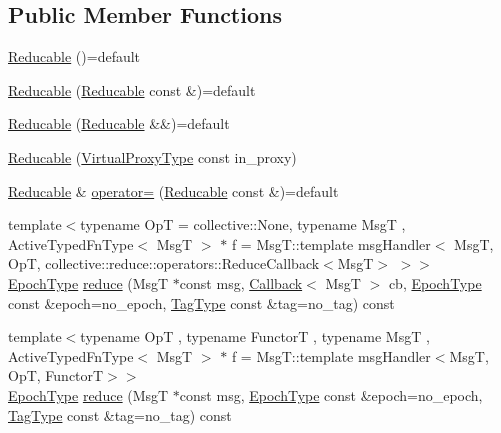 \subsection*{Public Member Functions}
\begin{DoxyCompactItemize}
\item 
\hyperlink{structvt_1_1vrt_1_1collection_1_1_reducable_a807b462380873448bfcf4661b4b28a2d}{Reducable} ()=default
\item 
\hyperlink{structvt_1_1vrt_1_1collection_1_1_reducable_aafc682961c7c961547d91358cda46792}{Reducable} (\hyperlink{structvt_1_1vrt_1_1collection_1_1_reducable}{Reducable} const \&)=default
\item 
\hyperlink{structvt_1_1vrt_1_1collection_1_1_reducable_a4c5250ba5364ae0965c119773e87f4e8}{Reducable} (\hyperlink{structvt_1_1vrt_1_1collection_1_1_reducable}{Reducable} \&\&)=default
\item 
\hyperlink{structvt_1_1vrt_1_1collection_1_1_reducable_a658b587cdafda69c95ad0a2efe7a73fe}{Reducable} (\hyperlink{namespacevt_a1b417dd5d684f045bb58a0ede70045ac}{Virtual\+Proxy\+Type} const in\+\_\+proxy)
\item 
\hyperlink{structvt_1_1vrt_1_1collection_1_1_reducable}{Reducable} \& \hyperlink{structvt_1_1vrt_1_1collection_1_1_reducable_a7df8661d0e353935f034c4c0174c0872}{operator=} (\hyperlink{structvt_1_1vrt_1_1collection_1_1_reducable}{Reducable} const \&)=default
\item 
{\footnotesize template$<$typename OpT  = collective\+::\+None, typename MsgT , Active\+Typed\+Fn\+Type$<$ Msg\+T $>$ $\ast$ f = Msg\+T\+::template msg\+Handler$<$      Msg\+T, Op\+T, collective\+::reduce\+::operators\+::\+Reduce\+Callback$<$\+Msg\+T$>$    $>$$>$ }\\\hyperlink{namespacevt_a985a5adf291c34a3ca263b3378388236}{Epoch\+Type} \hyperlink{structvt_1_1vrt_1_1collection_1_1_reducable_af049a8809d46da10f48d5fecbb1ace3d}{reduce} (MsgT $\ast$const msg, \hyperlink{namespacevt_a36db99df4c973d48b1118a293fff533f}{Callback}$<$ MsgT $>$ cb, \hyperlink{namespacevt_a985a5adf291c34a3ca263b3378388236}{Epoch\+Type} const \&epoch=no\+\_\+epoch, \hyperlink{namespacevt_a84ab281dae04a52a4b243d6bf62d0e52}{Tag\+Type} const \&tag=no\+\_\+tag) const
\item 
{\footnotesize template$<$typename OpT , typename FunctorT , typename MsgT , Active\+Typed\+Fn\+Type$<$ Msg\+T $>$ $\ast$ f = Msg\+T\+::template msg\+Handler$<$\+Msg\+T, Op\+T, Functor\+T$>$$>$ }\\\hyperlink{namespacevt_a985a5adf291c34a3ca263b3378388236}{Epoch\+Type} \hyperlink{structvt_1_1vrt_1_1collection_1_1_reducable_a4bd8f4179c7bfaddaac074a23e2c647b}{reduce} (MsgT $\ast$const msg, \hyperlink{namespacevt_a985a5adf291c34a3ca263b3378388236}{Epoch\+Type} const \&epoch=no\+\_\+epoch, \hyperlink{namespacevt_a84ab281dae04a52a4b243d6bf62d0e52}{Tag\+Type} const \&tag=no\+\_\+tag) const

\end{DoxyCompactItemize}
